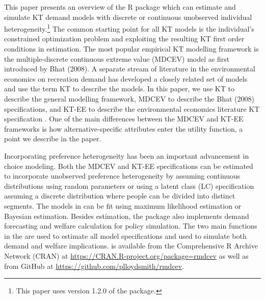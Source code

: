 This paper presents an overview of the R package  which can
estimate and simulate KT demand models with discrete or continuous
unobserved individual heterogeneity.\footnote{This paper uses version
  1.2.0 of the  package.} The common starting point for all
KT models is the individual's constrained optimization problem and
exploiting the resulting KT first order conditions in estimation. The
most popular empirical KT modelling framework is the multiple-discrete
continuous extreme value (MDCEV) model as first introduced by Bhat
(2008). A separate stream of literature in the environmental economics
on recreation demand has developed a closely related set of models and
use the term KT to describe the models. In this paper, we use KT to
describe the general modelling framework, MDCEV to describe the Bhat
(2008) specifications, and KT-EE to describe the environmental economics
literature KT specification \citep{vonhaefenestimation2004}. One of the
main differences between the MDCEV and KT-EE frameworks is how
alternative-specific attributes enter the utility function, a point we
describe in the paper.

Incorporating preference heterogeneity has been an important advancement
in choice modeling. Both the MDCEV and KT-EE specifications can be
estimated to incorporate unobserved preference heterogeneity by assuming
continuous distributions using random parameters or using a latent class
(LC) specification assuming a discrete distribution where people can be
divided into distinct segments. The models in  can be fit
using maximum likelihood estimation or Bayesian estimation. Besides
estimation, the  package also implements demand forecasting
and welfare calculation for policy simulation. The two main functions in
the  are  used to estimate all model
specifications and  used to simulate both demand and
welfare implications.  is available from the Comprehensive R
Archive Network (CRAN) at
\url{https://CRAN.R-project.org/package=rmdcev} as well as from GitHub
at \url{https://github.com/plloydsmith/rmdcev}.

